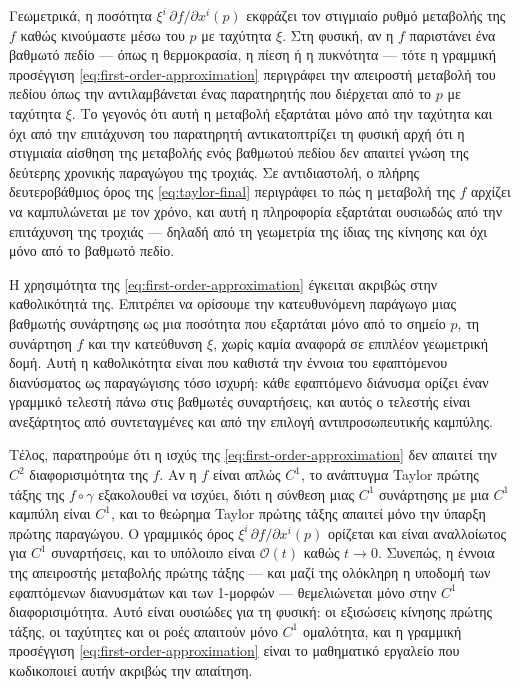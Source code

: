 \documentclass[11pt,a4paper,twoside,openright]{book}
\begin{document}
Γεωμετρικά, η ποσότητα $\xi^i \, \partial f / \partial x^i(p)$ εκφράζει τον στιγμιαίο ρυθμό μεταβολής της $f$ καθώς κινούμαστε μέσω του $p$ με ταχύτητα $\xi$. Στη φυσική, αν η $f$ παριστάνει ένα βαθμωτό πεδίο --- όπως η θερμοκρασία, η πίεση ή η πυκνότητα --- τότε η γραμμική προσέγγιση \eqref{eq:first-order-approximation} περιγράφει την απειροστή μεταβολή του πεδίου όπως την αντιλαμβάνεται ένας παρατηρητής που διέρχεται από το $p$ με ταχύτητα $\xi$. Το γεγονός ότι αυτή η μεταβολή εξαρτάται μόνο από την ταχύτητα και όχι από την επιτάχυνση του παρατηρητή αντικατοπτρίζει τη φυσική αρχή ότι η στιγμιαία αίσθηση της μεταβολής ενός βαθμωτού πεδίου δεν απαιτεί γνώση της δεύτερης χρονικής παραγώγου της τροχιάς. Σε αντιδιαστολή, ο πλήρης δευτεροβάθμιος όρος της \eqref{eq:taylor-final} περιγράφει το πώς η μεταβολή της $f$ αρχίζει να καμπυλώνεται με τον χρόνο, και αυτή η πληροφορία εξαρτάται ουσιωδώς από την επιτάχυνση της τροχιάς --- δηλαδή από τη γεωμετρία της ίδιας της κίνησης και όχι μόνο από το βαθμωτό πεδίο.

Η χρησιμότητα της \eqref{eq:first-order-approximation} έγκειται ακριβώς στην καθολικότητά της. Επιτρέπει να ορίσουμε την κατευθυνόμενη παράγωγο μιας βαθμωτής συνάρτησης ως μια ποσότητα που εξαρτάται μόνο από το σημείο $p$, τη συνάρτηση $f$ και την κατεύθυνση $\xi$, χωρίς καμία αναφορά σε επιπλέον γεωμετρική δομή. Αυτή η καθολικότητα είναι που καθιστά την έννοια του εφαπτόμενου διανύσματος ως παραγώγισης τόσο ισχυρή: κάθε εφαπτόμενο διάνυσμα ορίζει έναν γραμμικό τελεστή πάνω στις βαθμωτές συναρτήσεις, και αυτός ο τελεστής είναι ανεξάρτητος από συντεταγμένες και από την επιλογή αντιπροσωπευτικής καμπύλης.

Τέλος, παρατηρούμε ότι η ισχύς της \eqref{eq:first-order-approximation} δεν απαιτεί την $C^2$ διαφορισιμότητα της $f$. Αν η $f$ είναι απλώς $C^1$, το ανάπτυγμα Taylor πρώτης τάξης της $f \circ \gamma$ εξακολουθεί να ισχύει, διότι η σύνθεση μιας $C^1$ συνάρτησης με μια $C^1$ καμπύλη είναι $C^1$, και το θεώρημα Taylor πρώτης τάξης απαιτεί μόνο την ύπαρξη πρώτης παραγώγου. Ο γραμμικός όρος $\xi^i \, \partial f / \partial x^i(p)$ ορίζεται και είναι αναλλοίωτος για $C^1$ συναρτήσεις, και το υπόλοιπο είναι $\mathcal{O}(t)$ καθώς $t \to 0$. Συνεπώς, η έννοια της απειροστής μεταβολής πρώτης τάξης --- και μαζί της ολόκληρη η υποδομή των εφαπτόμενων διανυσμάτων και των 1-μορφών --- θεμελιώνεται μόνο στην $C^1$ διαφορισιμότητα. Αυτό είναι ουσιώδες για τη φυσική: οι εξισώσεις κίνησης πρώτης τάξης, οι ταχύτητες και οι ροές απαιτούν μόνο $C^1$ ομαλότητα, και η γραμμική προσέγγιση \eqref{eq:first-order-approximation} είναι το μαθηματικό εργαλείο που κωδικοποιεί αυτήν ακριβώς την απαίτηση.
\end{document}
